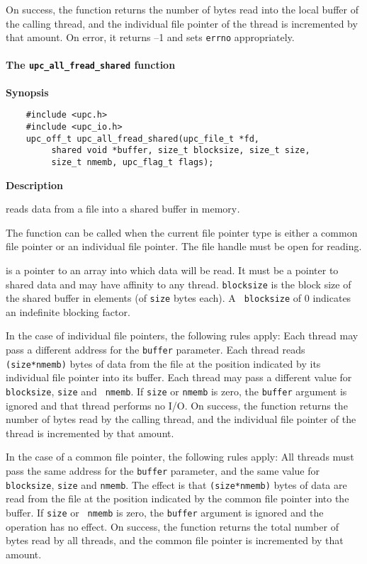\np On success, the function returns the number of bytes read into the local 
buffer of the calling thread, and the individual file pointer of the thread is
incremented by that amount. On error, it returns --1 and sets {\tt errno}
appropriately.

\paragraph{The {\tt upc\_all\_fread\_shared} function}

{\bf Synopsis}

\npf\vspace{-2.5em}
\begin{verbatim}
    #include <upc.h>
    #include <upc_io.h>
    upc_off_t upc_all_fread_shared(upc_file_t *fd, 
         shared void *buffer, size_t blocksize, size_t size,
         size_t nmemb, upc_flag_t flags);
\end{verbatim}

{\bf Description}

 reads data from a file into a shared buffer in
memory\textit{.}

\np The function can be called when the current file pointer type is either a
common file pointer or an individual file pointer. The file handle must be open
for reading. 

 is a pointer to an array into which data will be read. It must be a
pointer to shared data and may have affinity to any thread. {\tt blocksize} is the
block size of the shared buffer in elements (of {\tt size} bytes each). A {\tt
blocksize} of 0 indicates an indefinite blocking factor.

\np In the case of individual file pointers, the following rules apply: Each
thread may pass a different address for the {\tt buffer} parameter. 
Each thread reads {\tt (size*nmemb)} bytes of data from the
file at the position indicated by its individual file pointer into its buffer.
Each thread may pass a different value for {\tt blocksize}, {\tt size} and {\tt
nmemb}. If {\tt size} or {\tt nmemb} is zero, the {\tt buffer} argument is
ignored and that thread performs no I/O.  On success, the function returns the
number of bytes read by the calling thread, and the individual file pointer of
the thread is incremented by that amount.

\np In the case of a common file pointer, the following rules apply: All
threads must pass the same address for the {\tt buffer} parameter, and the 
same value for {\tt blocksize}, {\tt size} and {\tt nmemb}. The effect is that
{\tt (size*nmemb)} bytes of data are read from the file at the position
indicated by the common file pointer into the buffer.  If {\tt size} or {\tt
nmemb} is zero, the {\tt buffer} argument is ignored and the operation has no
effect.  On success, the function returns the total number of bytes read by all threads,
and the common file pointer is incremented by that amount.

